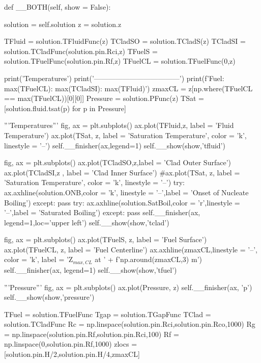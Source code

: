 \documentclass{article}
\begin{document}
\begin{python}
    def __BOTH(self, show = False):

        solution = self.solution
        z = solution.z

        TFluid = solution.TFluidFunc(z)
        TCladSO = solution.TCladS(z)
        TCladSI = solution.TCladFunc(solution.pin.Rci,z)
        TFuelS = solution.TFuelFunc(solution.pin.Rf,z)
        TFuelCL = solution.TFuelFunc(0,z)

        print('\tMaximum Temperatures')
        print('------------------------------------')
        print(f'Fuel: {max(TFuelCL)}\nClad: {max(TCladSI)}\nFluid: {max(TFluid)}')
        zmaxCL = z[np.where(TFuelCL == max(TFuelCL))[0][0]]
        Pressure = solution.PFunc(z)
        TSat = [solution.fluid.tsat(p) for p in Pressure]

        '''Temperatures'''
        fig, ax = plt.subplots()
        ax.plot(TFluid,z, label = 'Fluid Temperature')
        ax.plot(TSat, z, label = 'Saturation Temperature', color = 'k', linestyle = '--')
        self.__finisher(ax,legend=1)
        self.__show(show,'tfluid')

        fig, ax = plt.subplots()
        ax.plot(TCladSO,z,label = 'Clad Outer Surface')
        ax.plot(TCladSI,z , label = 'Clad Inner Surface')
        #ax.plot(TSat, z, label = 'Saturation Temperature', color = 'k', linestyle = '--')
        try:
            ax.axhline(solution.ONB,color = 'k', linestyle = '--',label = 'Onset of Nucleate Boiling')
        except: 
            pass
        try:
            ax.axhline(solution.SatBoil,color = 'r',linestyle = '--',label = 'Saturated Boiling')
        except:
            pass
        self.__finisher(ax, legend=1,loc='upper left')
        self.__show(show,'tclad')

        fig, ax = plt.subplots()
        ax.plot(TFuelS, z, label = 'Fuel Surface')
        ax.plot(TFuelCL, z, label = 'Fuel Centerline')
        ax.axhline(zmaxCL,linestyle = '--', color = 'k', label = 'Z$_{max,CL}$ at ' + f'{np.around(zmaxCL,3)} m')
        self.__finisher(ax, legend=1)
        self.__show(show,'tfuel')

        '''Pressure'''
        fig, ax = plt.subplots()
        ax.plot(Pressure, z)
        self.__finisher(ax, 'p')
        self.__show(show,'pressure')

        TFuel = solution.TFuelFunc
        Tgap = solution.TGapFunc
        TClad = solution.TCladFunc
        Rc = np.linspace(solution.pin.Rci,solution.pin.Rco,1000)
        Rg = np.linspace(solution.pin.Rf,solution.pin.Rci,100)
        Rf = np.linspace(0,solution.pin.Rf,1000)
        zlocs = [solution.pin.H/2,solution.pin.H/4,zmaxCL]


\end{python}
\end{document}
